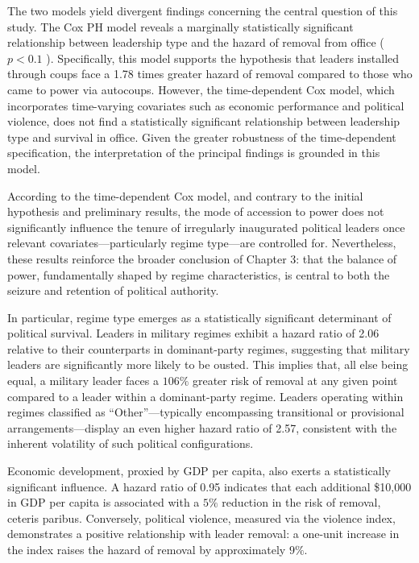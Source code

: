 \documentclass[
  12pt,
]{report}
\begin{document}
The two models yield divergent findings concerning the central question
of this study. The Cox PH model reveals a marginally statistically
significant relationship between leadership type and the hazard of
removal from office ( \(p < 0.1\) ). Specifically, this model supports
the hypothesis that leaders installed through coups face a 1.78 times
greater hazard of removal compared to those who came to power via
autocoups. However, the time-dependent Cox model, which incorporates
time-varying covariates such as economic performance and political
violence, does not find a statistically significant relationship between
leadership type and survival in office. Given the greater robustness of
the time-dependent specification, the interpretation of the principal
findings is grounded in this model.

According to the time-dependent Cox model, and contrary to the initial
hypothesis and preliminary results, the mode of accession to power does
not significantly influence the tenure of irregularly inaugurated
political leaders once relevant covariates---particularly regime
type---are controlled for. Nevertheless, these results reinforce the
broader conclusion of Chapter 3: that the balance of power,
fundamentally shaped by regime characteristics, is central to both the
seizure and retention of political authority.

In particular, regime type emerges as a statistically significant
determinant of political survival. Leaders in military regimes exhibit a
hazard ratio of 2.06 relative to their counterparts in dominant-party
regimes, suggesting that military leaders are significantly more likely
to be ousted. This implies that, all else being equal, a military leader
faces a \(106\%\) greater risk of removal at any given point compared to
a leader within a dominant-party regime. Leaders operating within
regimes classified as ``Other''---typically encompassing transitional or
provisional arrangements---display an even higher hazard ratio of 2.57,
consistent with the inherent volatility of such political
configurations.

Economic development, proxied by GDP per capita, also exerts a
statistically significant influence. A hazard ratio of 0.95 indicates
that each additional \$10,000 in GDP per capita is associated with a
\(5\%\) reduction in the risk of removal, ceteris paribus. Conversely,
political violence, measured via the violence index, demonstrates a
positive relationship with leader removal: a one-unit increase in the
index raises the hazard of removal by approximately \(9\%\).
\end{document}
